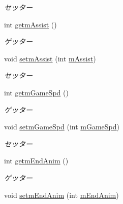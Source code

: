 \begin{DoxyCompactItemize}
\begin{DoxyCompactList}\small\item\em セッター \end{DoxyCompactList}\item 
int \hyperlink{classjp_1_1gr_1_1java__conf_1_1yuta__yoshinaga_1_1reversi_1_1model_1_1_reversi_setting_af2908862110772eff9fec1bcd153fd2e}{getm\+Assist} ()
\begin{DoxyCompactList}\small\item\em ゲッター \end{DoxyCompactList}\item 
void \hyperlink{classjp_1_1gr_1_1java__conf_1_1yuta__yoshinaga_1_1reversi_1_1model_1_1_reversi_setting_a193c4cf0ee146dc95f7ea3cea6df7f54}{setm\+Assist} (int \hyperlink{classjp_1_1gr_1_1java__conf_1_1yuta__yoshinaga_1_1reversi_1_1model_1_1_reversi_setting_a1845db256730cd6e4c17e44f0c35e60c}{m\+Assist})
\begin{DoxyCompactList}\small\item\em セッター \end{DoxyCompactList}\item 
int \hyperlink{classjp_1_1gr_1_1java__conf_1_1yuta__yoshinaga_1_1reversi_1_1model_1_1_reversi_setting_a16bc06302ae7ad228d4b7436958e9f20}{getm\+Game\+Spd} ()
\begin{DoxyCompactList}\small\item\em ゲッター \end{DoxyCompactList}\item 
void \hyperlink{classjp_1_1gr_1_1java__conf_1_1yuta__yoshinaga_1_1reversi_1_1model_1_1_reversi_setting_a23658b4244bacf68b40dfff9fc48429d}{setm\+Game\+Spd} (int \hyperlink{classjp_1_1gr_1_1java__conf_1_1yuta__yoshinaga_1_1reversi_1_1model_1_1_reversi_setting_a5a1815bcad09db9fb2c79c881786cb31}{m\+Game\+Spd})
\begin{DoxyCompactList}\small\item\em セッター \end{DoxyCompactList}\item 
int \hyperlink{classjp_1_1gr_1_1java__conf_1_1yuta__yoshinaga_1_1reversi_1_1model_1_1_reversi_setting_a96bbd11417e2c3fa781ea0c3ea570870}{getm\+End\+Anim} ()
\begin{DoxyCompactList}\small\item\em ゲッター \end{DoxyCompactList}\item 
void \hyperlink{classjp_1_1gr_1_1java__conf_1_1yuta__yoshinaga_1_1reversi_1_1model_1_1_reversi_setting_a8cd481bccc787fbab5f93c31909faeee}{setm\+End\+Anim} (int \hyperlink{classjp_1_1gr_1_1java__conf_1_1yuta__yoshinaga_1_1reversi_1_1model_1_1_reversi_setting_abeeff8de7f6317be4f26eaf5330f97a7}{m\+End\+Anim})

\end{DoxyCompactItemize}
